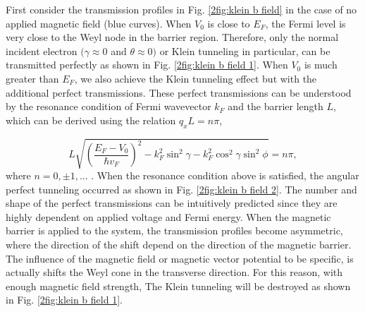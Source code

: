     First consider the transmission profiles in Fig. \ref{2fig:klein b field} in the case of no applied magnetic field (blue curves).
    When $V_0$ is close to $E_F$, the Fermi level is very close to the Weyl node in the barrier region. 
    Therefore, only the normal incident electron $(\gamma \approx 0$ and $\theta \approx 0)$ or Klein tunneling in particular, can be transmitted perfectly as shown in Fig. \ref{2fig:klein b field 1}.
    When $V_0$ is much greater than $E_F$, we also achieve the Klein tunneling effect but with the additional perfect transmissions.
    These perfect transmissions can be understood by the resonance condition of Fermi wavevector $k_F$ and the barrier length $L$, which can be derived using the relation $q_x L = n \pi$,
    
    \begin{equation}\label{2eq:resonance condition}
        L \sqrt{\left(\frac{E_F-V_0}{\hbar v_F}\right)^2-k_F^2 \sin^2{\gamma}-k_F^2 \cos^2{\gamma} \sin^2{\phi}}= n \pi,
    \end{equation}
    where $n = 0, \pm 1,...$ . When the resonance condition above is satisfied, the angular perfect tunneling occurred as shown in Fig. \ref{2fig:klein b field 2}.
    The number and shape of the perfect transmissions can be intuitively predicted since they are highly dependent on applied voltage and Fermi energy.
    When the magnetic barrier is applied to the system, the transmission profiles become asymmetric, where the direction of the shift depend on the direction of the magnetic barrier.
    The influence of the magnetic field or magnetic vector potential to be specific, is actually shifts the Weyl cone in the transverse direction.
    For this reason, with enough magnetic field strength, The Klein tunneling will be destroyed as shown in Fig. \ref{2fig:klein b field 1}. 
